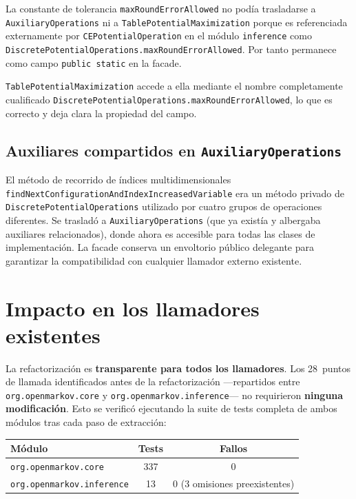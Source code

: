 \documentclass[11pt,a4paper]{article}
\newcommand{\code}[1]{\texttt{#1}}
\begin{document}
La constante de tolerancia \code{maxRoundErrorAllowed} no pod\'ia trasladarse a
\code{AuxiliaryOperations} ni a \code{TablePotentialMaximization} porque es
referenciada externamente por \code{CEPotentialOperation} en el m\'odulo
\code{inference} como \code{DiscretePotentialOperations.maxRoundErrorAllowed}.
Por tanto permanece como campo \code{public static} en la facade.

\code{TablePotentialMaximization} accede a ella mediante el nombre completamente
cualificado \code{DiscretePotentialOperations.maxRoundErrorAllowed}, lo que es
correcto y deja clara la propiedad del campo.

\subsection{Auxiliares compartidos en \code{AuxiliaryOperations}}

El m\'etodo de recorrido de \'indices multidimensionales
\code{findNextConfigurationAndIndexIncreasedVariable} era un m\'etodo privado de
\code{DiscretePotentialOperations} utilizado por cuatro grupos de operaciones
diferentes.  Se traslad\'o a \code{AuxiliaryOperations} (que ya exist\'ia y
albergaba auxiliares relacionados), donde ahora es accesible para todas las clases
de implementaci\'on.  La facade conserva un envoltorio p\'ublico delegante para
garantizar la compatibilidad con cualquier llamador externo existente.

\section{Impacto en los llamadores existentes}

La refactorizaci\'on es \textbf{transparente para todos los llamadores}.  Los
28~puntos de llamada identificados antes de la refactorizaci\'on ---repartidos entre
\code{org.openmarkov.core} y \code{org.openmarkov.inference}--- no requirieron
\textbf{ninguna modificaci\'on}.  Esto se verific\'o ejecutando la suite de tests
completa de ambos m\'odulos tras cada paso de extracci\'on:

\begin{center}
\begin{tabular}{lcc}
\toprule
\textbf{M\'odulo} & \textbf{Tests} & \textbf{Fallos} \\
\midrule
\code{org.openmarkov.core}      & 337 & 0 \\
\code{org.openmarkov.inference} & 13  & 0 (3 omisiones preexistentes) \\
\bottomrule
\end{tabular}
\end{center}
\end{document}
